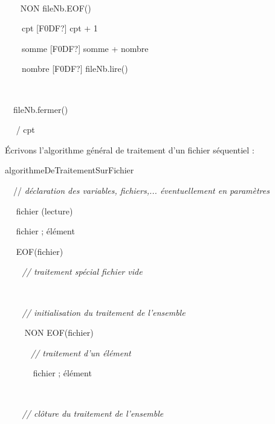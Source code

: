 {\sffamily
\ \  }


\bigskip

{\sffamily
\ \   \ NON fileNb.EOF()
}

{\sffamily
\ \ \ \ cpt {\textrm{[F0DF?]}} cpt + 1}

{\sffamily
\ \ \ \ somme {\textrm{[F0DF?]}} somme + nombre}

{\sffamily
\ \ \ \ nombre {\textrm{[F0DF?]}} fileNb.lire()}

{\sffamily
\ \   }

{\sffamily
\ \ fileNb.fermer()}

{\sffamily
\ \  / cpt}

{\sffamily
{} }


\bigskip

{
Écrivons l'algorithme général de traitement
d'un fichier séquentiel :}

{\sffamily
{} algorithmeDeTraitementSurFichier}


\bigskip

{\sffamily
\ \ // \textit{déclaration des variables, fichiers,... éventuellement en
paramètres}}


\bigskip

{\sffamily
\ \  fichier (lecture)}

{\sffamily
\ \  fichier ; élément}

{\sffamily
\ \  EOF(fichier) }

{\sffamily\itshape
\ \ \ \ // traitement spécial fichier vide}

{\sffamily
\ \ }

{\sffamily\itshape
\ \ \ \ // initialisation du traitement de l’ensemble}

{\sffamily
\ \ \ \   NON EOF(fichier)
}

{\sffamily\itshape
\ \ \ \ \ \ // traitement d’un élément}

{\sffamily
\ \ \ \ \ \  fichier ; élément}

{\sffamily
\ \ \ \   }

{\sffamily\itshape
\ \ \ \ // clôture du traitement de l’ensemble}

